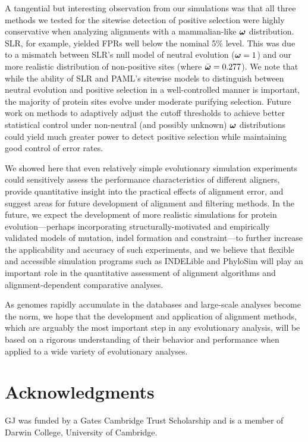 \documentclass{article}
\begin{document}
A tangential but interesting observation from our simulations was that
all three methods we tested for the sitewise detection of positive
selection were highly conservative when analyzing alignments with a
mammalian-like $\bm{\omega}$ distribution. SLR, for example, yielded FPRs
well below the nominal 5\% level. This was due to a mismatch between
SLR's null model of neutral evolution ($\bm{\omega}=1$) and our more
realistic distribution of non-positive sites (where
$\bar{\bm{\omega}}=0.277$). We note that while the ability of SLR and PAML's
sitewise models to distinguish between neutral evolution and positive
selection in a well-controlled manner is important, the majority of
protein sites evolve under moderate purifying selection. Future work
on methods to adaptively adjust the cutoff thresholds to achieve
better statistical control under non-neutral (and possibly unknown)
$\bm{\omega}$ distributions could yield much greater power to detect positive
selection while maintaining good control of error rates.

We showed here that even relatively simple evolutionary simulation
experiments could sensitively assess the performance characteristics
of different aligners, provide quantitative insight into the practical
effects of alignment error, and suggest areas for future development
of alignment and filtering methods. In the future, we expect the
development of more realistic simulations for protein
evolution---perhaps incorporating structurally-motivated and
empirically validated models of mutation, indel formation and
constraint---to further increase the applicability and accuracy of
such experiments, and we believe that flexible and accessible
simulation programs such as INDELible \citep{Fletcher2009INDELible}
and PhyloSim \citep{Sipos2011PhyloSim} will play an important role in
the quantitative assessment of alignment algorithms and
alignment-dependent comparative analyses.

As genomes rapidly accumulate in the databases and
large-scale analyses become the norm, we hope that the development and
application of alignment methods, which are arguably the most
important step in any evolutionary analysis, will be based on a
rigorous understanding of their behavior and performance when applied
to a wide variety of evolutionary analyses.

\section*{Acknowledgments}

GJ was funded by a Gates Cambridge Trust Scholarship and is a member
of Darwin College, University of Cambridge.

 \fontsize{9}{10}\selectfont%


\end{document}
